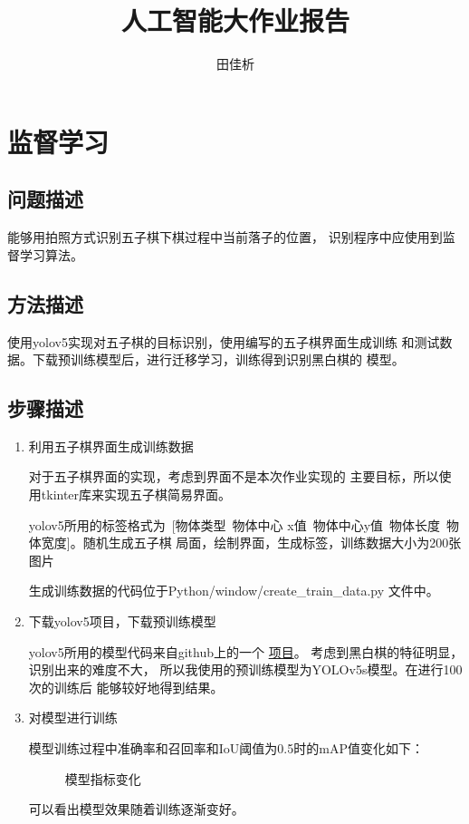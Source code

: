 \documentclass[UTF8]{article}
\title{人工智能大作业报告}
\author{田佳析}
\begin{document}
\maketitle
\tableofcontents

\section{监督学习}
\subsection{问题描述}
能够用拍照方式识别五子棋下棋过程中当前落子的位置，
识别程序中应使用到监督学习算法。
\subsection{方法描述}
使用yolov5实现对五子棋的目标识别，使用编写的五子棋界面生成训练
和测试数据。下载预训练模型后，进行迁移学习，训练得到识别黑白棋的
模型。

\subsection{步骤描述}

\begin{enumerate}
    \item 利用五子棋界面生成训练数据
    
    \subitem 对于五子棋界面的实现，考虑到界面不是本次作业实现的
    主要目标，所以使用tkinter库来实现五子棋简易界面。

    \subitem yolov5所用的标签格式为\ [物体类型\ 物体中心
    x值\ 物体中心y值\ 物体长度\ 物体宽度]。随机生成五子棋
    局面，绘制界面，生成标签，训练数据大小为200张图片

    \subitem 生成训练数据的代码位于Python/window/create\_train\_data.py
    文件中。
    
    \item 下载yolov5项目，下载预训练模型
    
    \subitem yolov5所用的模型代码来自github上的一个
    \href{https://github.com/ultralytics/yolov5}{项目}。
    考虑到黑白棋的特征明显，识别出来的难度不大，
    所以我使用的预训练模型为YOLOv5s模型。在进行100次的训练后
    能够较好地得到结果。

    \item 对模型进行训练
    
    \subitem 模型训练过程中准确率和召回率和IoU阈值为0.5时的mAP值变化如下：

    \begin{figure}[H]
        \centering
        \caption{模型指标变化}
    \end{figure}
    
    \subitem 可以看出模型效果随着训练逐渐变好。    

\end{enumerate}
\end{document}

